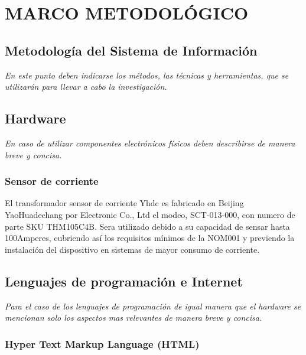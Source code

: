 

\chapter{ MARCO METODOLÓGICO }

\section{ Metodología del Sistema de Información  }

\textit{En este punto deben indicarse los métodos, las técnicas y herramientas, que se utilizarán para llevar a cabo la investigación.}

\section{ Hardware }

\textit{En caso de utilizar componentes electrónicos físicos deben describirse de manera breve y concisa.}

\subsection{ Sensor de corriente }

El transformador sensor de corriente Yhdc es fabricado en Beijing YaoHuadechang por Electronic Co., Ltd el modeo, SCT-013-000, con numero de parte SKU THM105C4B. Sera utilizado debido a su capacidad de sensar hasta 100Amperes, cubriendo así los requisitos mínimos de la NOM001 y previendo la instalación del dispositivo en sistemas de mayor consumo de corriente.

\section{ Lenguajes de programación e Internet }

\textit{Para el caso de los lenguajes de programación de igual manera que el hardware se mencionan solo los aspectos mas relevantes de manera breve y concisa. }

\subsection { Hyper Text Markup Language (HTML) }

